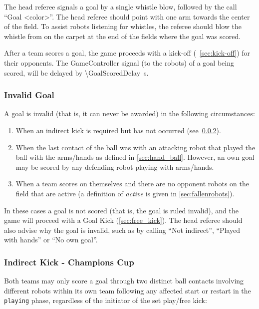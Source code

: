 The head referee signals a goal by a single whistle blow, followed by the call ``Goal \textless color\textgreater''.
The head referee should point with one arm towards the center of the field.
To assist robots listening for whistles, the referee should blow the whistle from on the carpet at the end of the fields where the goal was scored.

After a team scores a goal, the game proceeds with a kick-off (\cf~\cref{sec:kick-off}) for their opponents.
The GameController signal (to the robots) of a goal being scored, will be delayed by \qty{\GoalScoredDelay}{\second}.

\subsubsection{Invalid Goal}
\label{sec:invalid_goal}

A goal is invalid (that is, it can never be awarded) in the following circumstances:
\begin{enumerate}
    \item When an indirect kick is required but has not occurred (see~\cref{sec:indirect_kick_champions}).
    \item When the last contact of the ball was with an attacking robot that played the ball with the arms/hands as defined in \cref{sec:hand_ball}.
      However, an own goal may be scored by any defending robot playing with arms/hands.
    \item When a team scores on themselves and there are no opponent robots on the field that are active (a definition of \emph{active} is given in \cref{sec:fallenrobots}).
\end{enumerate}

In these cases a goal is not scored (that is, the goal is ruled invalid), and the game will proceed with a Goal Kick (\cf \cref{sec:free_kick}).
The head referee should also advise why the goal is invalid, such as by calling ``Not indirect'', ``Played with hands'' or ``No own goal''.

\subsubsection{Indirect Kick - Champions Cup}
\label{sec:indirect_kick_champions}

Both teams may only score a goal through two distinct ball contacts involving different robots within its own team following any affected start or restart in the \texttt{playing} phase, regardless of the initiator of the set play/free kick:

